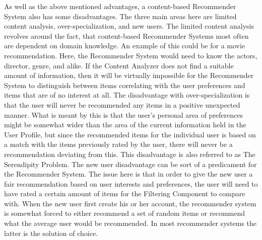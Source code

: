 As well as the above mentioned advantages, a content-based Recommender System also has some disadvantages. The three main areas here are limited content analysis, over-specialization, and new users.\newline
The limited content analysis revolves around the fact, that content-based Recommender Systems most often are dependent on domain knowledge. An example of this could be for a movie recommendation. Here, the Recommender System would need to know the actors, director, genre, and alike. If the Content Analyzer does not find a suitable amount of information, then it will be virtually impossible for the Recommender System to distinguish between items correlating with the user preferences and items that are of no interest at all.\newline
The disadvantage with over-specialization is that the user will never be recommended any items in a positive unexpected manner. What is meant by this is that the user's personal area of preferences might be somewhat wider than the area of the current information held in the User Profile, but since the recommended items for the individual user is based on a match with the items previously rated by the user, there will never be a recommendation deviating from this. This disadvantage is also referred to as The Serendipity Problem.\newline
The new user disadvantage can be sort of a predicament for the Recommender System. The issue here is that in order to give the new user a fair recommendation based on user interests and preferences, the user will need to have rated a certain amount of items for the Filtering Component to compare with. When the new user first create his or her account, the recommender system is somewhat forced to either recommend a set of random items or recommend what the average user would be recommended. In most recommender systems the latter is the solution of choice.

